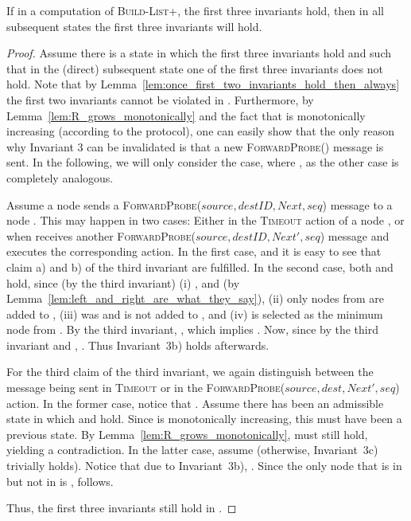 \documentclass[a4paper,USenglish]{lipics}
\newcommand{\blp}{\textsc{Build-List+}\xspace}
\newcommand{\timeout}{\textsc{Timeout}\xspace}
\newcommand{\forwardprobe}[1]{\textsc{ForwardProbe(\ensuremath{#1})}\xspace}
\begin{document}
\begin{lemma}\label{lem:once_first_three_invariants_hold_then_always}
 If in a computation of \blp, the first three invariants hold, then in all subsequent states the first three invariants will hold.
\end{lemma}
\begin{proof}
  Assume there is a state  in which the first three invariants hold and such that in the (direct) subsequent state  one of the first three invariants does not hold.
  Note that by Lemma~\ref{lem:once_first_two_invariants_hold_then_always} the first two invariants cannot be violated in .
  Furthermore, by Lemma~\ref{lem:R_grows_monotonically} and the fact that  is monotonically increasing (according to the protocol), one can easily show that the only reason why Invariant 3 can be invalidated is that a new \forwardprobe{} message is sent.
  In the following, we will only consider the case, where , as the other case is completely analogous.
  
  	Assume a node  sends a \forwardprobe{source,destID,Next,seq} message to a node .
	This may happen in two cases: Either in the \timeout action of a node , or when  receives another \forwardprobe{source,destID,Next',seq} message and executes the corresponding action.
	In the first case,  and it is easy to see that claim a) and b) of the third invariant are fulfilled.
	In the second case, both  and  hold, since (by the third invariant) (i) , and  (by Lemma~\ref{lem:left_and_right_are_what_they_say}), (ii) only nodes from  are added to , (iii)  was  and is not added to , and (iv)  is selected as the minimum node from . 
	By the third invariant, , which implies .
	Now, since  by the third invariant and , .
	Thus Invariant~3b) holds afterwards.
	
	For the third claim of the third invariant, we again distinguish between the message being sent in \timeout or in the \forwardprobe{source,dest,Next',seq} action.
	In the former case, notice that .
	Assume there has been an admissible state in which  and  hold.
	Since  is monotonically increasing, this must have been a previous state.
	By Lemma~\ref{lem:R_grows_monotonically},  must still hold, yielding a contradiction.
	In the latter case, assume  (otherwise, Invariant~3c) trivially holds).
	Notice that due to Invariant~3b), .
	Since the only node that is in  but not in  is ,  follows.
	
  Thus, the first three invariants still hold in .
\end{proof}
\end{document}
